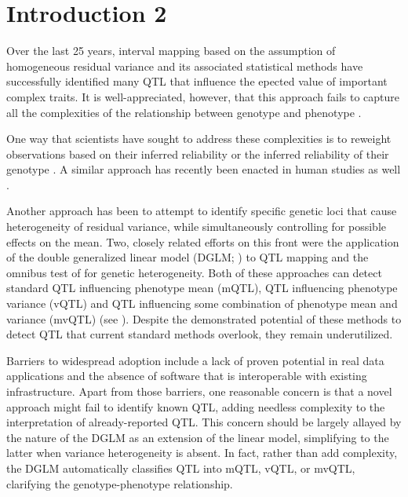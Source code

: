 \section{Introduction 2}
Over the last 25 years, interval mapping based on the assumption of homogeneous residual variance and its associated statistical methods \citep{Lander1989a,Martinez1992,Haley1992,Churchill1994} have successfully identified many QTL that influence the epected value of important complex traits.
    It is well-appreciated, however, that this approach fails to capture all the complexities of the relationship between genotype and phenotype \citep{GeilerSamerotte2013,Nelson2013,Shen2012,Forsberg2015,Pare2010}.

    One way that scientists have sought to address these complexities is to reweight observations based on their inferred reliability \citep{Xu1998} or the inferred reliability of their genotype \citep{Feenstra2006}.
    A similar approach has recently been enacted in human studies as well \citep{Ma2015}.

    Another approach has been to attempt to identify specific genetic loci that cause heterogeneity of residual variance, while simultaneously controlling for possible effects on the mean.
    Two, closely related efforts on this front were the application of the double generalized linear model (DGLM; \citealt{Smyth1989}) to QTL mapping \citep{Ronnegard2011a} and the omnibus test of \citet{Cao2014} for genetic heterogeneity.
    Both of these approaches can detect standard QTL influencing phenotype mean (mQTL), QTL influencing phenotype variance (vQTL) and QTL influencing some combination of phenotype mean and variance (mvQTL) (see \CortyMethodsPaper).
    Despite the demonstrated potential of these methods to detect QTL that current standard methods overlook, they remain underutilized.

    Barriers to widespread adoption include a lack of proven potential in real data applications and the absence of software that is interoperable with existing infrastructure.
    Apart from those barriers, one reasonable concern is that a novel approach might fail to identify known QTL, adding needless complexity to the interpretation of already-reported QTL.
    This concern should be largely allayed by the nature of the DGLM as an extension of the linear model, simplifying to the latter when variance heterogeneity is absent.
    In fact, rather than add complexity, the DGLM automatically classifies QTL into mQTL, vQTL, or mvQTL, clarifying the genotype-phenotype relationship.

